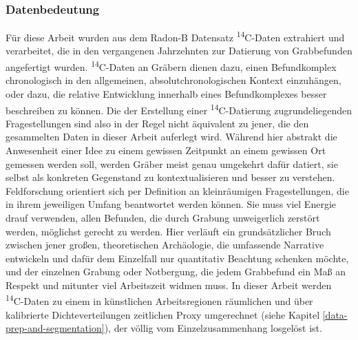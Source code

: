 \documentclass[openany,twoside,twocolumn]{book}
\begin{document}
\hypertarget{datenbedeutung}{%
\subsubsection{Datenbedeutung}\label{datenbedeutung}}

Für diese Arbeit wurden aus dem Radon-B Datensatz
\textsuperscript{14}C-Daten extrahiert und verarbeitet, die in den
vergangenen Jahrzehnten zur Datierung von Grabbefunden angefertigt
wurden. \textsuperscript{14}C-Daten an Gräbern dienen dazu, einen
Befundkomplex chronologisch in den allgemeinen, absolutchronologischen
Kontext einzuhängen, oder dazu, die relative Entwicklung innerhalb eines
Befundkomplexes besser beschreiben zu können. Die der Erstellung einer
\textsuperscript{14}C-Datierung zugrundeliegenden Fragestellungen sind
also in der Regel nicht äquivalent zu jener, die den gesammelten Daten
in dieser Arbeit auferlegt wird. Während hier abstrakt die Anwesenheit
einer Idee zu einem gewissen Zeitpunkt an einem gewissen Ort gemessen
werden soll, werden Gräber meist genau umgekehrt dafür datiert, sie
selbst als konkreten Gegenstand zu kontextualisieren und besser zu
verstehen. Feldforschung orientiert sich per Definition an kleinräumigen
Fragestellungen, die in ihrem jeweiligen Umfang beantwortet werden
können. Sie muss viel Energie drauf verwenden, allen Befunden, die durch
Grabung unweigerlich zerstört werden, möglichst gerecht zu werden. Hier
verläuft ein grundsätzlicher Bruch zwischen jener großen, theoretischen
Archäologie, die umfassende Narrative entwickeln und dafür dem
Einzelfall nur quantitativ Beachtung schenken möchte, und der einzelnen
Grabung oder Notbergung, die jedem Grabbefund ein Maß an Respekt und
mitunter viel Arbeitszeit widmen muss. In dieser Arbeit werden
\textsuperscript{14}C-Daten zu einem in künstlichen Arbeitsregionen
räumlichen und über kalibrierte Dichteverteilungen zeitlichen Proxy
umgerechnet (siehe Kapitel \ref{data-prep-and-segmentation}), der völlig
vom Einzelzusammenhang losgelöst ist.
\end{document}
